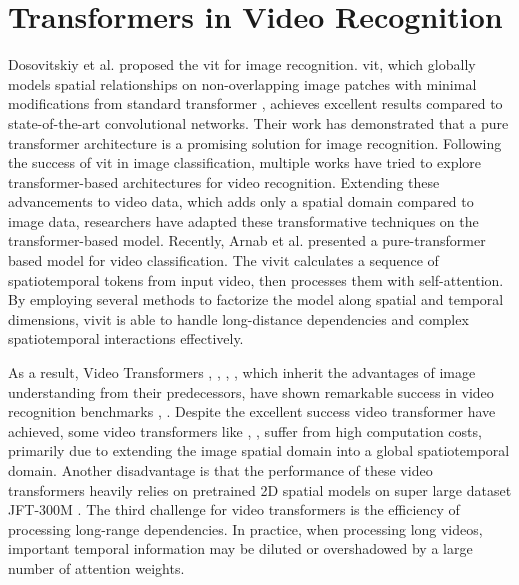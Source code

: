 \section{Transformers in Video Recognition}
\label{sec:Transformers in Video Recognition}
Dosovitskiy et al. \cite{dosovitskiy_image_2021} proposed the \gls{vit} for image recognition. \gls{vit}, which globally models spatial relationships on non-overlapping image patches with minimal modifications from standard transformer \cite{vaswani_attention_2023}, achieves excellent results compared to state-of-the-art convolutional networks. Their work has demonstrated that a pure transformer architecture is a promising solution for image recognition. Following the success of \gls{vit} in image classification, multiple works have tried to explore transformer-based architectures for video recognition. Extending these advancements to video data, which adds only a spatial domain compared to image data, researchers have adapted these transformative techniques on the transformer-based model. Recently, Arnab et al. \cite{arnab_vivit_2021} presented a pure-transformer based model for video classification. The \gls{vivit} calculates a sequence of spatiotemporal tokens from input video, then processes them with self-attention. By employing several methods to factorize the model along spatial and temporal dimensions, \gls{vivit} is able to handle long-distance dependencies and complex spatiotemporal interactions effectively.

As a result, Video Transformers \cite{bertasius_is_2021}, \cite{liu_video_2021}, \cite{herzig_object-region_2022}, \cite{neimark_video_2021}, which inherit the advantages of image understanding from their predecessors, have shown remarkable success in video recognition benchmarks \cite{russakovsky_imagenet_2015}, \cite{kay_kinetics_2017}. Despite the excellent success video transformer have achieved, some video transformers like \cite{arnab_vivit_2021}, \cite{bertasius_is_2021}, \cite{neimark_video_2021} suffer from high computation costs, primarily due to extending the image spatial domain into a global spatiotemporal domain. Another disadvantage is that the performance of these video transformers heavily relies on pretrained 2D spatial models on super large dataset JFT-300M \cite{Sun_Rev_2017}. The third challenge for video transformers is the efficiency of processing long-range dependencies.  In practice, when processing long videos, important temporal information may be diluted or overshadowed by a large number of attention weights.

